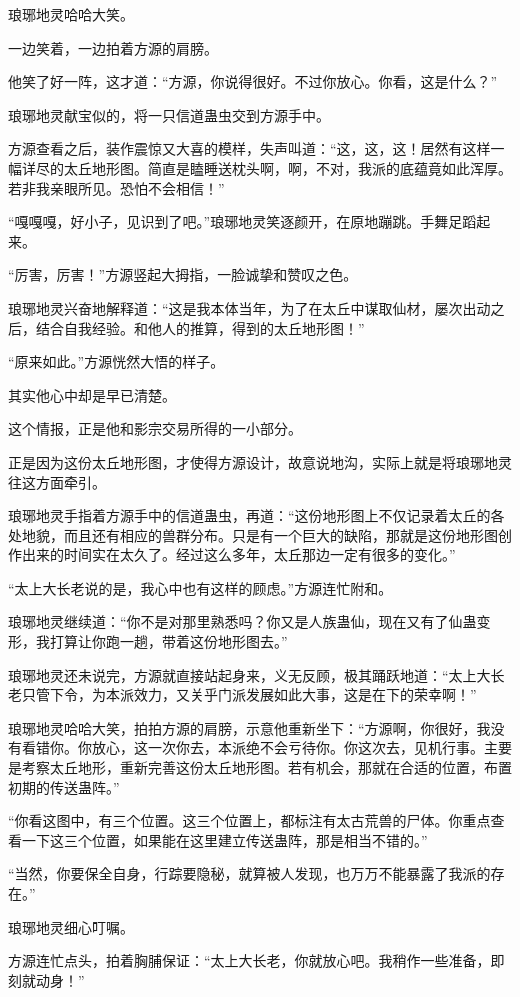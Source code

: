 \begin{this_body}
琅琊地灵哈哈大笑。

一边笑着，一边拍着方源的肩膀。

他笑了好一阵，这才道：“方源，你说得很好。不过你放心。你看，这是什么？”

琅琊地灵献宝似的，将一只信道蛊虫交到方源手中。

方源查看之后，装作震惊又大喜的模样，失声叫道：“这，这，这！居然有这样一幅详尽的太丘地形图。简直是瞌睡送枕头啊，啊，不对，我派的底蕴竟如此浑厚。若非我亲眼所见。恐怕不会相信！”

“嘎嘎嘎，好小子，见识到了吧。”琅琊地灵笑逐颜开，在原地蹦跳。手舞足蹈起来。

“厉害，厉害！”方源竖起大拇指，一脸诚挚和赞叹之色。

琅琊地灵兴奋地解释道：“这是我本体当年，为了在太丘中谋取仙材，屡次出动之后，结合自我经验。和他人的推算，得到的太丘地形图！”

“原来如此。”方源恍然大悟的样子。

其实他心中却是早已清楚。

这个情报，正是他和影宗交易所得的一小部分。

正是因为这份太丘地形图，才使得方源设计，故意说地沟，实际上就是将琅琊地灵往这方面牵引。

琅琊地灵手指着方源手中的信道蛊虫，再道：“这份地形图上不仅记录着太丘的各处地貌，而且还有相应的兽群分布。只是有一个巨大的缺陷，那就是这份地形图创作出来的时间实在太久了。经过这么多年，太丘那边一定有很多的变化。”

“太上大长老说的是，我心中也有这样的顾虑。”方源连忙附和。

琅琊地灵继续道：“你不是对那里熟悉吗？你又是人族蛊仙，现在又有了仙蛊变形，我打算让你跑一趟，带着这份地形图去。”

琅琊地灵还未说完，方源就直接站起身来，义无反顾，极其踊跃地道：“太上大长老只管下令，为本派效力，又关乎门派发展如此大事，这是在下的荣幸啊！”

琅琊地灵哈哈大笑，拍拍方源的肩膀，示意他重新坐下：“方源啊，你很好，我没有看错你。你放心，这一次你去，本派绝不会亏待你。你这次去，见机行事。主要是考察太丘地形，重新完善这份太丘地形图。若有机会，那就在合适的位置，布置初期的传送蛊阵。”

“你看这图中，有三个位置。这三个位置上，都标注有太古荒兽的尸体。你重点查看一下这三个位置，如果能在这里建立传送蛊阵，那是相当不错的。”

“当然，你要保全自身，行踪要隐秘，就算被人发现，也万万不能暴露了我派的存在。”

琅琊地灵细心叮嘱。

方源连忙点头，拍着胸脯保证：“太上大长老，你就放心吧。我稍作一些准备，即刻就动身！”


\end{this_body}
